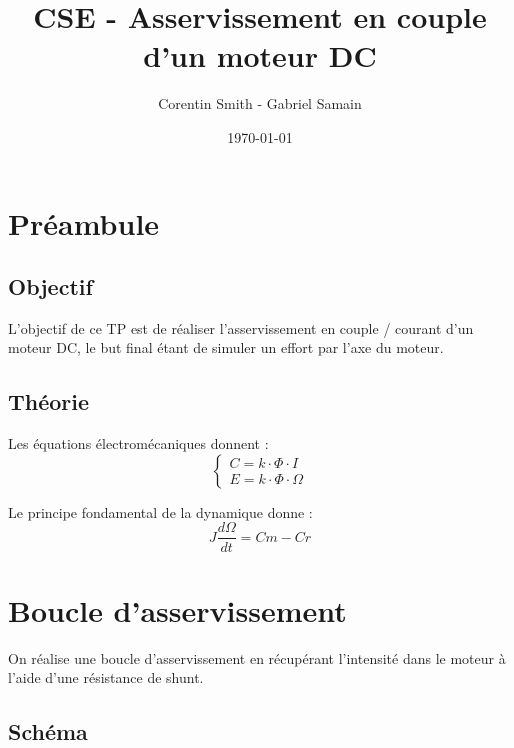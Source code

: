 \documentclass[a4paper]{article}
\title{CSE - Asservissement en couple d'un moteur DC}
\author{Corentin Smith - Gabriel Samain}
\date{\today}
\begin{document}
\maketitle


\section{Préambule}

\subsection{Objectif}

L'objectif de ce TP est de réaliser l'asservissement en couple / courant d'un moteur DC, le but final étant de simuler un effort par l'axe du moteur.

\subsection{Théorie}

Les équations électromécaniques donnent : 
$$
\begin{cases}
C = k \cdot \Phi \cdot I \\
E = k \cdot \Phi \cdot \Omega
\end{cases}
$$

Le principe fondamental de la dynamique donne :
$$
J \frac{d\Omega}{dt} = Cm - Cr
$$


\section{Boucle d'asservissement}

On réalise une boucle d’asservissement en récupérant l’intensité dans le moteur à l’aide d’une résistance de shunt.

\subsection{Schéma}

\begin{center}
\end{center}
\end{document}
